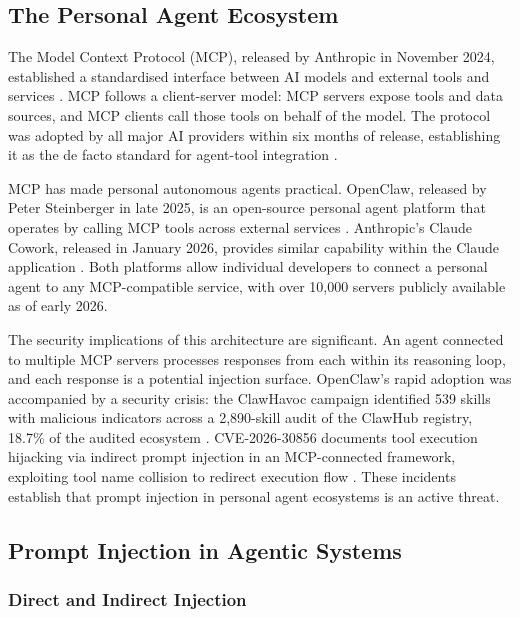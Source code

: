 \documentclass[conference]{IEEEtran}
\begin{document}
\subsection{The Personal Agent Ecosystem}

The Model Context Protocol (MCP), released by Anthropic in November 2024, established a
standardised interface between AI models and external tools and services
\cite{anthropic_mcp_2024}. MCP follows a client-server model: MCP servers expose tools
and data sources, and MCP clients call those tools on behalf of the model. The protocol
was adopted by all major AI providers within six months of release, establishing it as
the de facto standard for agent-tool integration \cite{anthropic_mcp_foundation_2025}.

MCP has made personal autonomous agents practical. OpenClaw, released by Peter Steinberger
in late 2025, is an open-source personal agent platform that operates by calling MCP tools
across external services \cite{openclaw_2025}. Anthropic's Claude Cowork, released in
January 2026, provides similar capability within the Claude application
\cite{anthropic_cowork_2026}. Both platforms allow individual developers to connect a
personal agent to any MCP-compatible service, with over 10,000 servers publicly available
as of early 2026.

The security implications of this architecture are significant. An agent connected to
multiple MCP servers processes responses from each within its reasoning loop, and each
response is a potential injection surface. OpenClaw's rapid adoption was accompanied by a
security crisis: the ClawHavoc campaign identified 539 skills with malicious
indicators across a 2,890-skill audit of the ClawHub registry, 18.7\% of the audited
ecosystem \cite{clawhavoc_2026}. CVE-2026-30856 documents tool execution hijacking via
indirect prompt injection in an MCP-connected framework, exploiting tool name collision to
redirect execution flow \cite{cve_2026_30856}. These incidents establish that prompt
injection in personal agent ecosystems is an active threat.

\subsection{Prompt Injection in Agentic Systems}

\subsubsection{Direct and Indirect Injection}
\end{document}
